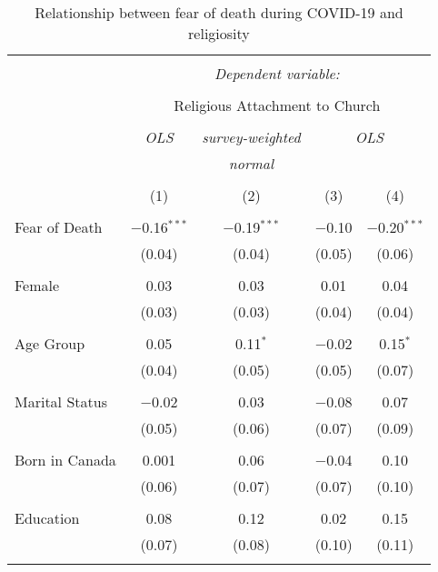
\begin{table}[!htbp] \centering 
  \caption{Relationship between fear of death during COVID-19 and religiosity} 
  \label{} 
\begin{tabular}{@{\extracolsep{5pt}}lcccc} 
\\[-1.8ex]\hline 
\hline \\[-1.8ex] 
 & \multicolumn{4}{c}{\textit{Dependent variable:}} \\ 
\cline{2-5} 
\\[-1.8ex] & \multicolumn{4}{c}{Religious Attachment to Church} \\ 
\\[-1.8ex] & \textit{OLS} & \textit{survey-weighted} & \multicolumn{2}{c}{\textit{OLS}} \\ 
 & \textit{} & \textit{normal} & \multicolumn{2}{c}{\textit{}} \\ 
\\[-1.8ex] & (1) & (2) & (3) & (4)\\ 
\hline \\[-1.8ex] 
 Fear of Death & $-$0.16$^{***}$ & $-$0.19$^{***}$ & $-$0.10 & $-$0.20$^{***}$ \\ 
  & (0.04) & (0.04) & (0.05) & (0.06) \\ 
  & & & & \\ 
 Female & 0.03 & 0.03 & 0.01 & 0.04 \\ 
  & (0.03) & (0.03) & (0.04) & (0.04) \\ 
  & & & & \\ 
 Age Group & 0.05 & 0.11$^{*}$ & $-$0.02 & 0.15$^{*}$ \\ 
  & (0.04) & (0.05) & (0.05) & (0.07) \\ 
  & & & & \\ 
 Marital Status & $-$0.02 & 0.03 & $-$0.08 & 0.07 \\ 
  & (0.05) & (0.06) & (0.07) & (0.09) \\ 
  & & & & \\ 
 Born in Canada & 0.001 & 0.06 & $-$0.04 & 0.10 \\ 
  & (0.06) & (0.07) & (0.07) & (0.10) \\ 
  & & & & \\ 
 Education & 0.08 & 0.12 & 0.02 & 0.15 \\ 
  & (0.07) & (0.08) & (0.10) & (0.11) \\ 
  & & & & \\ 

\end{tabular}
\end{table}

